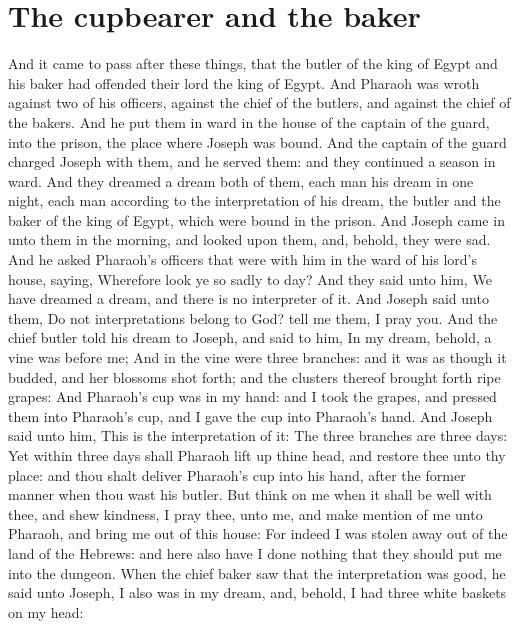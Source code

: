 \section*{The cupbearer and the baker}
\begin{biblechapter} %
\verse And it came to pass after these things, that the butler of the king of Egypt and his baker had offended their lord the king of Egypt.
\verse And Pharaoh was wroth against two of his officers, against the chief of the butlers, and against the chief of the bakers.
\verse And he put them in ward in the house of the captain of the guard, into the prison, the place where Joseph was bound.
\verse And the captain of the guard charged Joseph with them, and he served them: and they continued a season in ward.
\verse And they dreamed a dream both of them, each man his dream in one night, each man according to the interpretation of his dream, the butler and the baker of the king of Egypt, which were bound in the prison.
\verse And Joseph came in unto them in the morning, and looked upon them, and, behold, they were sad.
\verse And he asked Pharaoh's officers that were with him in the ward of his lord's house, saying, Wherefore look ye so sadly to day?
\verse And they said unto him, We have dreamed a dream, and there is no interpreter of it. And Joseph said unto them, Do not interpretations belong to God? tell me them, I pray you.
\verse And the chief butler told his dream to Joseph, and said to him, In my dream, behold, a vine was before me;
\verse And in the vine were three branches: and it was as though it budded, and her blossoms shot forth; and the clusters thereof brought forth ripe grapes:
\verse And Pharaoh's cup was in my hand: and I took the grapes, and pressed them into Pharaoh's cup, and I gave the cup into Pharaoh's hand.
\verse And Joseph said unto him, This is the interpretation of it: The three branches are three days:
\verse Yet within three days shall Pharaoh lift up thine head, and restore thee unto thy place: and thou shalt deliver Pharaoh's cup into his hand, after the former manner when thou wast his butler.
\verse But think on me when it shall be well with thee, and shew kindness, I pray thee, unto me, and make mention of me unto Pharaoh, and bring me out of this house:
\verse For indeed I was stolen away out of the land of the Hebrews: and here also have I done nothing that they should put me into the dungeon.
\verse When the chief baker saw that the interpretation was good, he said unto Joseph, I also was in my dream, and, behold, I had three white baskets on my head:

\end{biblechapter}
